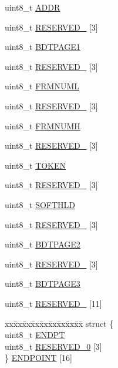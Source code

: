 \begin{DoxyCompactItemize}
uint8\+\_\+t \hyperlink{struct_u_s_b___mem_map_a6b1fac9acdf7f6c7e0471af3886c6a8e}{A\+D\+DR}
\item 
uint8\+\_\+t \hyperlink{struct_u_s_b___mem_map_ae5232a4f0fad6b378ed9b5cf2334ec2f}{R\+E\+S\+E\+R\+V\+E\+D\+\_} \mbox{[}3\mbox{]}
\item 
uint8\+\_\+t \hyperlink{struct_u_s_b___mem_map_ac61eff507f744f947ebf311e4d0a3767}{B\+D\+T\+P\+A\+G\+E1}
\item 
uint8\+\_\+t \hyperlink{struct_u_s_b___mem_map_aaca846c7a5ad434ef5ca2bdd0afa3097}{R\+E\+S\+E\+R\+V\+E\+D\+\_} \mbox{[}3\mbox{]}
\item 
uint8\+\_\+t \hyperlink{struct_u_s_b___mem_map_a13d399a89566e622c5de92668f520768}{F\+R\+M\+N\+U\+ML}
\item 
uint8\+\_\+t \hyperlink{struct_u_s_b___mem_map_a323b2e876677952f283931c075882bb0}{R\+E\+S\+E\+R\+V\+E\+D\+\_} \mbox{[}3\mbox{]}
\item 
uint8\+\_\+t \hyperlink{struct_u_s_b___mem_map_a9df319e9feb132fdd9caa55264acfc30}{F\+R\+M\+N\+U\+MH}
\item 
uint8\+\_\+t \hyperlink{struct_u_s_b___mem_map_a8af0319fa823d36eb32a0276ab5052c7}{R\+E\+S\+E\+R\+V\+E\+D\+\_} \mbox{[}3\mbox{]}
\item 
uint8\+\_\+t \hyperlink{struct_u_s_b___mem_map_a8806f493a96bf80f94a1b04fd5a595a7}{T\+O\+K\+EN}
\item 
uint8\+\_\+t \hyperlink{struct_u_s_b___mem_map_af1b3dbe2aa5bd0b752abbdf9c29d70b6}{R\+E\+S\+E\+R\+V\+E\+D\+\_} \mbox{[}3\mbox{]}
\item 
uint8\+\_\+t \hyperlink{struct_u_s_b___mem_map_a5462ecd3a3fe1425826815c78bfb8120}{S\+O\+F\+T\+H\+LD}
\item 
uint8\+\_\+t \hyperlink{struct_u_s_b___mem_map_ae58f8f823509af251c9145ef32f35c82}{R\+E\+S\+E\+R\+V\+E\+D\+\_} \mbox{[}3\mbox{]}
\item 
uint8\+\_\+t \hyperlink{struct_u_s_b___mem_map_abb9113fced941f9af402d501dd6dc301}{B\+D\+T\+P\+A\+G\+E2}
\item 
uint8\+\_\+t \hyperlink{struct_u_s_b___mem_map_a443f87251df6c05ff456e604ca853052}{R\+E\+S\+E\+R\+V\+E\+D\+\_} \mbox{[}3\mbox{]}
\item 
uint8\+\_\+t \hyperlink{struct_u_s_b___mem_map_afd1f5b8867e36b32297641c5fe0b283b}{B\+D\+T\+P\+A\+G\+E3}
\item 
uint8\+\_\+t \hyperlink{struct_u_s_b___mem_map_a3fd06de5424ba76a2ad43d024b8602cd}{R\+E\+S\+E\+R\+V\+E\+D\+\_} \mbox{[}11\mbox{]}
\item 
\begin{tabbing}
xx\=xx\=xx\=xx\=xx\=xx\=xx\=xx\=xx\=\kill
struct \{\\
\>uint8\_t \hyperlink{struct_u_s_b___mem_map_a86aaba02227a45a333f72565b0bec378}{ENDPT}\\
\>uint8\_t \hyperlink{struct_u_s_b___mem_map_a4b7eb7f7cc53dc2ce43ba695fdee3ced}{RESERVED\_0} \mbox{[}3\mbox{]}\\
\} \hyperlink{struct_u_s_b___mem_map_af56587a25ad8b3d5c1353e436046a7be}{ENDPOINT} \mbox{[}16\mbox{]}\\


\end{tabbing}
\end{DoxyCompactItemize}
